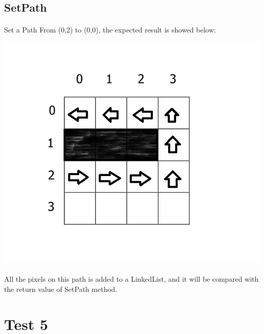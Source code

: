 \documentclass[11pt, a4paper]{report}
\begin{document}
\subsection{SetPath}
\paragraph{}Set a Path From (0,2) to (0,0), the expected result is showed below:\\
\begin{center}
\includegraphics[scale=0.4]{./image/Test4SetPath.png}
\end{center}
\paragraph{}All the pixels on this path is added to a LinkedList, and it will be compared with the return value of SetPath method.


\section{Test 5}
\end{document}
